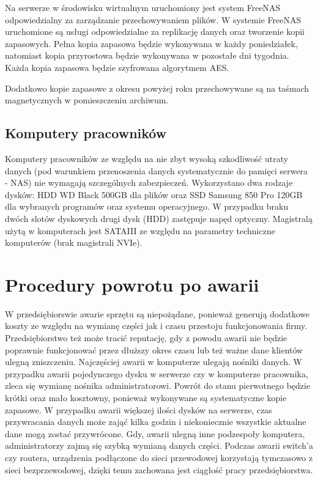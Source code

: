 Na serwerze w środowisku wirtualnym uruchomiony jest system FreeNAS odpowiedzialny za zarządzanie przechowywaniem plików. W systemie FreeNAS uruchomione są usługi odpowiedzialne za replikację danych oraz tworzenie kopii zapasowych. Pełna kopia zapasowa będzie wykonywana w każdy poniedziałek, natomiast kopia przyrostowa będzie wykonywana w pozostałe dni tygodnia. Każda kopia zapasowa będzie szyfrowana algorytmem AES.

Dodatkowo kopie zapasowe z okresu powyżej roku przechowywane są na taśmach magnetycznych w pomieszczeniu archiwum.

\subsection{Komputery pracowników}
Komputery pracowników ze względu na nie zbyt wysoką szkodliwość utraty danych (pod warunkiem przenoszenia danych systematycznie do pamięci serwera - NAS) nie wymagają szczególnych zabezpieczeń. Wykorzystano dwa rodzaje dysków: HDD WD Black 500GB dla plików oraz SSD Samsung 850 Pro 120GB dla wybranych programów oraz systemu operacyjnego. W przypadku braku dwóch slotów dyskowych drugi dysk (HDD) zastępuje napęd optyczny. Magistralą użytą w komputerach jest SATAIII ze względu na parametry techniczne komputerów (brak magistrali NVIe).

\section{Procedury powrotu po awarii}
W przedsiębiorswie awarie sprzętu są niepożądane, ponieważ generują dodatkowe koszty ze względu na wymianę części jak i czasu przestoju funkcjonowania firmy. Przedsiębiorstwo też może tracić reputację, gdy z powodu awarii nie będzie poprawnie funkcjonować przez dłuższy okres czasu lub też ważne dane klientów ulegną zniszczeniu. Najczęściej awarii w komputerze ulegają nośniki danych. W przypadku awarii pojedynczego dysku w serwerze czy w komputerze pracownika, zleca się wymianę nośnika administratorowi. Powrót do stanu pierwotnego będzie krótki oraz mało kosztowny, ponieważ wykonywane są systematyczne kopie zapasowe. W przypadku awarii większej ilości dysków na serwerze, czas przywracania danych może zająć kilka godzin i niekoniecznie wszystkie aktualne dane mogą zostać przywrócone.
Gdy, awarii ulegną inne podzespoły komputera, administratorzy zajmą się szybką wymianą danych części.
Podczas awarii switch'a czy routera, urządzenia podłączone do sieci przewodowej korzystają tymczasowo z sieci bezprzewodowej, dzięki temu zachowana jest ciągłość pracy przedsiębiorstwa.

